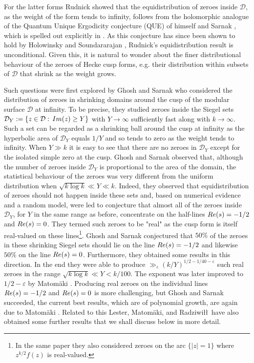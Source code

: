\documentclass[a4paper,10pt,twoside]{amsart}
\theoremstyle{definition}
\numberwithin{equation}{section}
\newcommand\eps{\varepsilon}
\renewcommand{\Re}{\textnormal{Re}}
\renewcommand{\Im}{\textnormal{Im}}
\renewcommand\:{\colon}
\begin{document}
For the latter forms Rudnick \cite{Rudnick2005} showed that the equidistribution of zeroes inside $\mathcal D$, as the weight of the form tends to infinity, follows from the holomorphic analogue of the Quantum Unique Ergodicity conjecture (QUE) of himself and Sarnak \cite{Rudnick-Sarnak1994}, which is spelled out explicitly in \cite{Luo-Sarnak2003, Sarnak2001}. As this conjecture has since been shown to hold by Holowinsky and Soundararajan \cite{Holowinsky-Soundararajan2010}, Rudnick's equidistribution result is unconditional. Given this, it is natural to wonder about the finer distributional behaviour of the zeroes of Hecke cusp forms, e.g. their distribution within subsets of $\mathcal D$ that shrink as the weight grows.

Such questions were first explored by Ghosh and Sarnak \cite{Ghosh-Sarnak2012} who considered the distribution of zeroes in shrinking domains around the cusp of the modular surface $\mathcal D$ at infinity. To be precise, they studied zeroes inside the Siegel sets $\mathcal D_Y:=\{z\in\mathcal D:\,\Im(z)\geq Y\}$ with $Y\longrightarrow\infty$ sufficiently fast along with $k\longrightarrow\infty$. Such a set can be regarded as a shrinking ball around the cusp at infinity as the hyperbolic area of $\mathcal D_Y$ equals $1/Y$ and so tends to zero as the weight tends to infinity. When $Y\gg k$ it is easy to see that there are no zeroes in $\mathcal D_Y$ except for the isolated simple zero at the cusp. Ghosh and Sarnak observed that, although the number of zeroes inside $\mathcal D_Y$ is proportional to the area of the domain, the statistical behaviour of the zeroes was very different from the uniform distribution when $\sqrt{k\log k}\ll Y\ll k$. Indeed, they observed that equidistribution of zeroes should not happen inside these sets and, based on  numerical evidence and a random model, were led to conjecture that almost all of the zeroes inside $\mathcal D_Y$, for $Y$ in the same range as before, concentrate on the half-lines $\Re(s)=-1/2$ and $\Re(s)=0$. They termed such zeroes to be "real" as the cusp form is itself real-valued on these lines\footnote{In the same paper they also considered zeroes on the arc $\{|z|=1\}$ where $z^{k/2}f(z)$ is real-valued.}. Ghosh and Sarnak conjectured that $50\%$ of the zeroes in these shrinking Siegel sets should lie on the line $\Re(s)=-1/2$ and likewise $50\%$ on the line $\Re(s)=0$. Furthermore, they obtained some results in this direction. In the end they were able to produce $\gg_\varepsilon (k/Y)^{1/2-1/40-\varepsilon}$ such real zeroes in the range $\sqrt{k\log k}\ll Y<k/100$. The exponent was later improved to $1/2-\eps$ by Matom\"aki \cite{Matomaki2016}. Producing real zeroes on the individual lines $\Re(s)=-1/2$ and $\Re(s)=0$ is more challenging, but Ghosh and Sarnak succeeded, the current best results, which are of polynomial growth, are again due to Matom\"aki \cite{Matomaki2016}. Related to this Lester, Matom\"aki, and Radziwi\l\l$\,$\cite{Lester-Matomaki-Radziwill2018} have also obtained some further results that we shall discuss below in more detail.  
\end{document}
